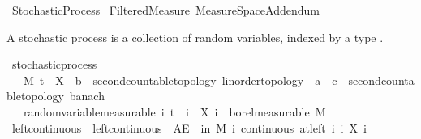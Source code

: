%
\begin{isabellebody}%
%
%
\isadelimtheory
%
\endisadelimtheory
%
\isatagtheory
{}\isamarkupfalse%
\ Stochastic{\isacharunderscore}{\kern0pt}Process\isanewline
{}\ Filtered{\isacharunderscore}{\kern0pt}Measure\ Measure{\isacharunderscore}{\kern0pt}Space{\isacharunderscore}{\kern0pt}Addendum\isanewline
{}%
\endisatagtheory
{\isafoldtheory}%
%
\isadelimtheory
%
\endisadelimtheory
%
\isadelimdocument
%
\endisadelimdocument
%
\isatagdocument
%
\isamarkuptrue%
%
\endisatagdocument
{\isafolddocument}%
%
\isadelimdocument
%
\endisadelimdocument
%
\begin{isamarkuptext}%
A stochastic process is a collection of random variables, indexed by a type .%
\end{isamarkuptext}\isamarkuptrue%
\isamarkupfalse%
\ stochastic{\isacharunderscore}{\kern0pt}process\ {\isacharequal}{\kern0pt}\isanewline
\ \ \ M\ t\ \ X\ {\isacharcolon}{\kern0pt}{\isacharcolon}{\kern0pt}\ {\isachardoublequoteopen}{\isacharprime}{\kern0pt}b\ {\isacharcolon}{\kern0pt}{\isacharcolon}{\kern0pt}\ {\isacharbraceleft}{\kern0pt}second{\isacharunderscore}{\kern0pt}countable{\isacharunderscore}{\kern0pt}topology{\isacharcomma}{\kern0pt}\ linorder{\isacharunderscore}{\kern0pt}topology{\isacharbraceright}{\kern0pt}\ {\isasymRightarrow}\ {\isacharprime}{\kern0pt}a\ {\isasymRightarrow}\ {\isacharprime}{\kern0pt}c\ {\isacharcolon}{\kern0pt}{\isacharcolon}{\kern0pt}\ {\isacharbraceleft}{\kern0pt}second{\isacharunderscore}{\kern0pt}countable{\isacharunderscore}{\kern0pt}topology{\isacharcomma}{\kern0pt}\ banach{\isacharbraceright}{\kern0pt}{\isachardoublequoteclose}\isanewline
\ \ \ random{\isacharunderscore}{\kern0pt}variable{\isacharbrackleft}{\kern0pt}measurable{\isacharbrackright}{\kern0pt}{\isacharcolon}{\kern0pt}\ {\isachardoublequoteopen}{\isasymAnd}i{\isachardot}{\kern0pt}\ t\ {\isasymle}\ i\ {\isasymLongrightarrow}\ X\ i\ {\isasymin}\ borel{\isacharunderscore}{\kern0pt}measurable\ M{\isachardoublequoteclose}\isanewline
{}\isanewline
\isanewline
{}\isamarkupfalse%
\ left{\isacharunderscore}{\kern0pt}continuous\ \ {\isachardoublequoteopen}left{\isacharunderscore}{\kern0pt}continuous\ {\isacharequal}{\kern0pt}\ {\isacharparenleft}{\kern0pt}AE\ {\isasymxi}\ in\ M{\isachardot}{\kern0pt}\ {\isasymforall}i{\isachardot}{\kern0pt}\ continuous\ {\isacharparenleft}{\kern0pt}at{\isacharunderscore}{\kern0pt}left\ i{\isacharparenright}{\kern0pt}\ {\isacharparenleft}{\kern0pt}{\isasymlambda}i{\isachardot}{\kern0pt}\ X\ i\ {\isasymxi}{\isacharparenright}{\kern0pt}{\isacharparenright}{\kern0pt}{\isachardoublequoteclose}\isanewline

\end{isabellebody}
